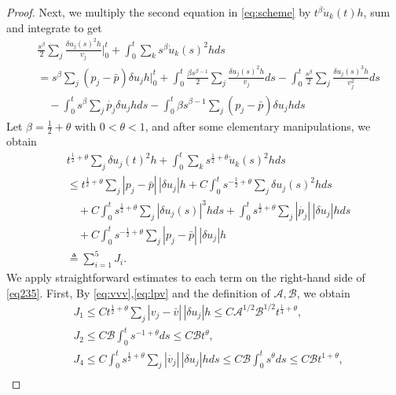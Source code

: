 \documentclass[a4paper,oneside,11pt]{article}
\numberwithin{equation}{section}
\begin{document}
\begin{proof}
Next, we multiply the second equation in \eqref{eq:scheme} by \(t^{\beta}\dot{u}_{k}(t)h\), sum and integrate to get
\begin{equation}\label{eq:t-beta}\begin{aligned}
		&\frac{s^{\beta}}{2}\sum_{j}\frac{\delta u_{j}(s)^{2}h}{v_j}\Big|_0^t+\int_{0}^{t}\sum_{k}s^{\beta}\dot{u}_{k}(s)^{2}hds \\&= s^{\beta}\sum_{j}(p_j-\bar p)\delta u_j h\Big|_0^t+\int_0^t\frac{\beta s^{\beta-1}}{2}\sum_{j}\frac{\delta u_{j}(s)^{2}h}{v_j}ds%
		-\int_0^t\frac{s^{\beta}}{2}\sum_{j}\frac{\delta u_{j}(s)^{3}h}{v_j^2}ds \\&
		\quad-\int_{0}^{t}s^{\beta}\sum_{j}\dot{p_j}\delta u_j hds-\int_{0}^{t}\beta s^{\beta-1}\sum_{j}(p_j-\bar p)\delta u_j hds
\end{aligned}\end{equation}
Let $\beta=\frac{1}{2}+\theta$ with \(0<\theta<1\), and after some elementary manipulations, we obtain
\begin{equation}\label{eq235}\begin{aligned}
&t^{\frac{1}{2}+\theta}\sum_{j}\delta u_{j}(t)^{2}h+\int_{0}^{t}\sum_{k}s^{\frac{1}{2}+\theta}\dot{u}_{k}(s)^{2}hds \\
&\leq t^{\frac{1}{2}+\theta}\sum_{j}|p_j-\bar p|\,|\delta u_j| h+C\int_0^ts^{-\frac{1}{2}+\theta}\sum_{j}\delta u_{j}(s)^{2}hds\\
&\quad		+C\int_0^ts^{\frac{1}{2}+\theta}\sum_{j}|\delta u_{j}(s)|^{3}hds +\int_{0}^{t}s^{\frac{1}{2}+\theta}\sum_{j}|\dot{p_j}|\,|\delta u_j| hds\\&\quad+C\int_{0}^{t}s^{-\frac{1}{2}+\theta}\sum_{j}|p_j-\bar p|\,|\delta u_j| h \\&\triangleq \sum_{i=1}^{5}J_i.
\end{aligned}\end{equation}
We apply straightforward estimates to each term on the right-hand side of \eqref{eq235}. First, By \eqref{eq:vvv},\eqref{eq:lpv} and the definition of $\mathscr{A},\mathscr{B}$, we obtain
\begin{align}
	&J_1\leq C t^{\frac{1}{2}+\theta}\sum_{j}|v_j-\bar v|\,|\delta u_j| h\leq C\mathscr{A}^{1/2}\mathscr{B}^{1/2}t^{\frac{1}{4}+\theta},\label{eq:ux-j1}\\
	&J_2\leq C\mathscr{B}\int_0^ts^{-1+\theta}ds\leq C\mathscr{B}t^\theta,\\
	&J_4\leq C\int_{0}^{t}s^{\frac{1}{2}+\theta}\sum_{j}|\dot{v_j}|\,|\delta u_j| hds\leq C\mathscr{B}\int_0^ts^{\theta}ds\leq C\mathscr{B}t^{1+\theta},\\

\end{align}
\end{proof}
\end{document}
